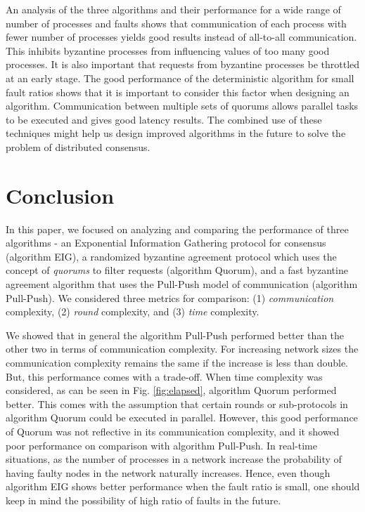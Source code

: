 An analysis of the three algorithms and their performance for a wide range of number of processes and faults shows that communication of each process with fewer number of processes yields good results instead of all-to-all communication. This inhibits byzantine processes from influencing values of too many good processes. It is also important that requests from byzantine processes be throttled at an early stage. The good performance of the deterministic algorithm for small fault ratios shows that it is important to consider this factor when designing an algorithm.  Communication between multiple sets of quorums allows parallel tasks to be executed and gives good latency results. The combined use of these techniques might help us design improved algorithms in the future to solve the problem of distributed consensus. 


\section{Conclusion}
\label{sec:conc}

In this paper, we focused on analyzing and comparing the performance of three algorithms - an Exponential Information Gathering protocol for consensus \cite{KM13} (algorithm EIG), a randomized byzantine agreement protocol which uses the concept of \textit{quorums} to filter requests \cite{BPV06} (algorithm Quorum), and a fast byzantine agreement algorithm that uses the Pull-Push model of communication \cite{BGH13} (algorithm Pull-Push). We considered three metrics for comparison: (1) \textit{communication} complexity, (2) \textit{round} complexity, and (3) \textit{time} complexity. 

We showed that in general the algorithm Pull-Push performed better than the other two in terms of communication complexity. For increasing network sizes the communication complexity remains the same if the increase is less than double. But, this performance comes with a trade-off. When time complexity was considered, as can be seen in Fig. \ref{fig:elapsed}, algorithm Quorum performed better. This comes with the assumption that certain rounds or sub-protocols in algorithm Quorum could be executed in parallel. However, this good performance of Quorum was not reflective in its communication complexity, and it showed poor performance on comparison with algorithm Pull-Push. In real-time situations, as the number of processes in a network increase the probability of having faulty nodes in the network naturally increases. Hence, even though algorithm EIG shows better performance when the fault ratio is small, one should keep in mind the possibility of high ratio of faults in the future.

